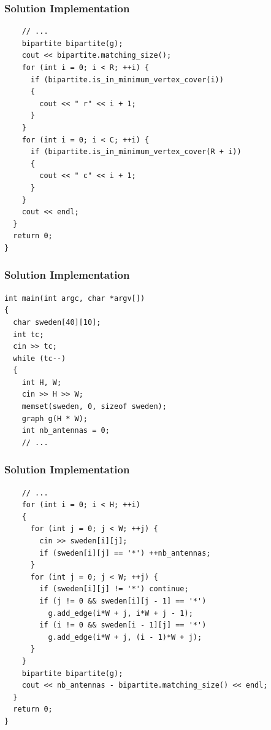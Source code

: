 \documentclass{beamer}
\newcommand{\uvalink}[2]{UVa Online Judge (http://uva.onlinejudge.org)
  problem number \href{#2}{\textcolor{blue}{#1}.}}
\newcounter{exo}
\newcommand{\exo}{
  \addtocounter{exo}{1}
  Exercice \arabic{exo}
}
\begin{document}
\begin{frame}[containsverbatim]
\frametitle{Solution Implementation}
\scriptsize

\begin{lstlisting}
    // ...
    bipartite bipartite(g);
    cout << bipartite.matching_size();
    for (int i = 0; i < R; ++i) {
      if (bipartite.is_in_minimum_vertex_cover(i))
      {
        cout << " r" << i + 1;
      }
    }
    for (int i = 0; i < C; ++i) {
      if (bipartite.is_in_minimum_vertex_cover(R + i))
      {
        cout << " c" << i + 1;
      }
    }
    cout << endl;
  }
  return 0;
}
\end{lstlisting}

\end{frame}

\fi


\ifanswers

\begin{frame}[containsverbatim]
\frametitle{Solution Implementation}
\scriptsize

\begin{lstlisting}
int main(int argc, char *argv[])
{
  char sweden[40][10];
  int tc;
  cin >> tc;
  while (tc--)
  {
    int H, W;
    cin >> H >> W;
    memset(sweden, 0, sizeof sweden);
    graph g(H * W);
    int nb_antennas = 0;
    // ...
\end{lstlisting}

\end{frame}

\begin{frame}[containsverbatim]
\frametitle{Solution Implementation}
\scriptsize

\begin{lstlisting}
    // ...
    for (int i = 0; i < H; ++i)
    {
      for (int j = 0; j < W; ++j) {
        cin >> sweden[i][j];
        if (sweden[i][j] == '*') ++nb_antennas;
      }
      for (int j = 0; j < W; ++j) {
        if (sweden[i][j] != '*') continue;
        if (j != 0 && sweden[i][j - 1] == '*')
          g.add_edge(i*W + j, i*W + j - 1);
        if (i != 0 && sweden[i - 1][j] == '*')
          g.add_edge(i*W + j, (i - 1)*W + j);
      }
    }
    bipartite bipartite(g);
    cout << nb_antennas - bipartite.matching_size() << endl;
  }
  return 0;
}
\end{lstlisting}

\end{frame}
\end{document}
